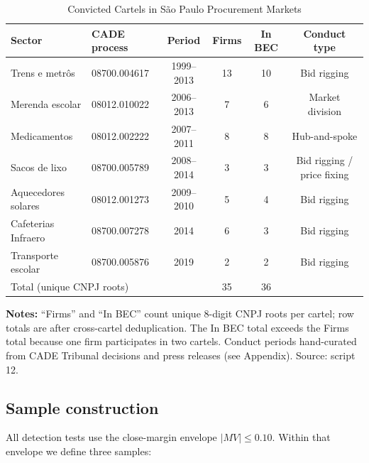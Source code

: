 \begin{table}[htbp]
\centering
\caption{Convicted Cartels in S\~{a}o Paulo Procurement Markets}\label{tab:cartels}
\begin{tabular}{p{3.2cm}lcccc}
\toprule
Sector & CADE process & Period & Firms & In BEC & Conduct type \\
\midrule
Trens e metr\^{o}s & 08700.004617 & 1999--2013 & 13 & 10 & Bid rigging \\
Merenda escolar & 08012.010022 & 2006--2013 & 7 & 6 & Market division \\
Medicamentos & 08012.002222 & 2007--2011 & 8 & 8 & Hub-and-spoke \\
Sacos de lixo & 08700.005789 & 2008--2014 & 3 & 3 & Bid rigging / price fixing \\
Aquecedores solares & 08012.001273 & 2009--2010 & 5 & 4 & Bid rigging \\
Cafeterias Infraero & 08700.007278 & 2014 & 6 & 3 & Bid rigging \\
Transporte escolar & 08700.005876 & 2019 & 2 & 2 & Bid rigging \\
\midrule
\multicolumn{2}{l}{Total (unique CNPJ roots)} & & 35 & 36 & \\
\bottomrule
\end{tabular}
\vspace{0.5em}
\begin{minipage}{0.95\textwidth}
\scriptsize{\textbf{Notes:} ``Firms'' and ``In BEC'' count unique 8-digit CNPJ roots per cartel; row totals are after cross-cartel deduplication. The In BEC total exceeds the Firms total because one firm participates in two cartels. Conduct periods hand-curated from CADE Tribunal decisions and press releases (see Appendix). Source: script 12.\par}
\end{minipage}
\end{table}

\subsection{Sample construction}

All detection tests use the close-margin envelope $\lvert MV \rvert \le 0.10$. Within that envelope we define three samples:

